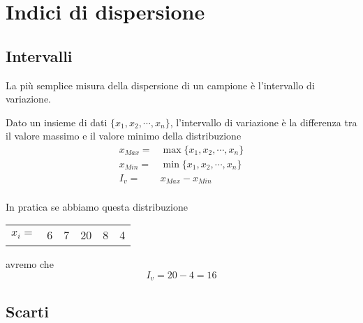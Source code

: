 \chapter{Indici di dispersione}
\section{Intervalli}
La più semplice misura della dispersione di un campione è l'intervallo di variazione.
\begin{defn}
	Dato un insieme di dati  $\lbrace x_{1},x_{2},\cdots,x_{n}\rbrace$, l'intervallo di variazione è la differenza tra il valore massimo e il valore minimo della distribuzione 
	\begin{align*}
	x_{Max}=&\max\lbrace x_{1},x_{2},\cdots,x_{n}\rbrace\\
	x_{Min}=&\min\lbrace x_{1},x_{2},\cdots,x_{n}\rbrace\\
	I_v=&x_{Max}-x_{Min}\\
	\end{align*}
\end{defn}
In pratica se abbiamo questa distribuzione
\begin{center}
	\begin{tabular}{l*{2} {S[table-format=1.0]}S[table-format=2.0]*{2} {S[table-format=1.0]}}
		{$x_{i}=$}	&6  &7  &20  &8  &4 \\  
	\end{tabular}
\end{center}
avremo che \[I_v=20-4=16\]
\section{Scarti}
